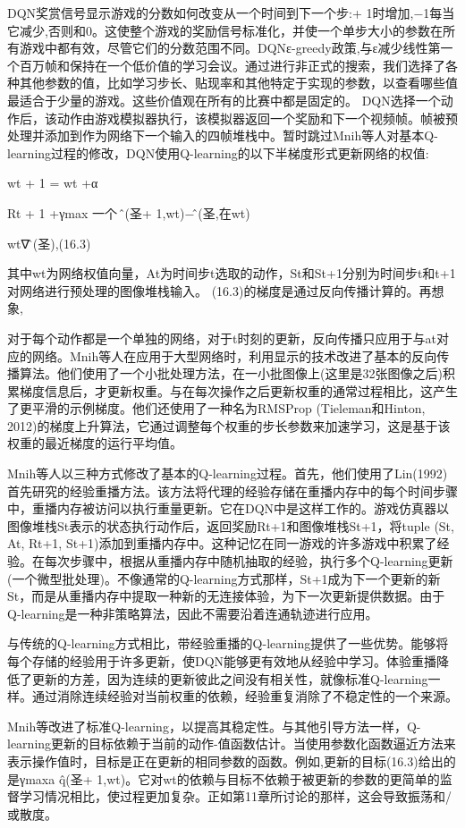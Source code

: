 DQN奖赏信号显示游戏的分数如何改变从一个时间到下一个步:+ 1时增加,−1每当它减少,否则和0。这使整个游戏的奖励信号标准化，并使一个单步大小的参数在所有游戏中都有效，尽管它们的分数范围不同。DQNε-greedy政策,与ε减少线性第一个百万帧和保持在一个低价值的学习会议。通过进行非正式的搜索，我们选择了各种其他参数的值，比如学习步长、贴现率和其他特定于实现的参数，以查看哪些值最适合于少量的游戏。这些价值观在所有的比赛中都是固定的。
DQN选择一个动作后，该动作由游戏模拟器执行，该模拟器返回一个奖励和下一个视频帧。帧被预处理并添加到作为网络下一个输入的四帧堆栈中。暂时跳过Mnih等人对基本Q-learning过程的修改，DQN使用Q-learning的以下半梯度形式更新网络的权值:

wt + 1 = wt +α

Rt + 1 +γmax
一个
问̂(圣+ 1,wt)−问̂(圣,在wt)

wt∇问̂(圣),(16.3)

其中wt为网络权值向量，At为时间步t选取的动作，St和St+1分别为时间步t和t+1对网络进行预处理的图像堆栈输入。
(16.3)的梯度是通过反向传播计算的。再想象,

对于每个动作都是一个单独的网络，对于t时刻的更新，反向传播只应用于与at对应的网络。Mnih等人在应用于大型网络时，利用显示的技术改进了基本的反向传播算法。他们使用了一个小批处理方法，在一小批图像上(这里是32张图像之后)积累梯度信息后，才更新权重。与在每次操作之后更新权重的通常过程相比，这产生了更平滑的示例梯度。他们还使用了一种名为RMSProp (Tieleman和Hinton, 2012)的梯度上升算法，它通过调整每个权重的步长参数来加速学习，这是基于该权重的最近梯度的运行平均值。

Mnih等人以三种方式修改了基本的Q-learning过程。首先，他们使用了Lin(1992)首先研究的经验重播方法。该方法将代理的经验存储在重播内存中的每个时间步骤中，重播内存被访问以执行重量更新。它在DQN中是这样工作的。游戏仿真器以图像堆栈St表示的状态执行动作后，返回奖励Rt+1和图像堆栈St+1，将tuple (St, At, Rt+1, St+1)添加到重播内存中。这种记忆在同一游戏的许多游戏中积累了经验。在每次步骤中，根据从重播内存中随机抽取的经验，执行多个Q-learning更新(一个微型批处理)。不像通常的Q-learning方式那样，St+1成为下一个更新的新St，而是从重播内存中提取一种新的无连接体验，为下一次更新提供数据。由于Q-learning是一种非策略算法，因此不需要沿着连通轨迹进行应用。

与传统的Q-learning方式相比，带经验重播的Q-learning提供了一些优势。能够将每个存储的经验用于许多更新，使DQN能够更有效地从经验中学习。体验重播降低了更新的方差，因为连续的更新彼此之间没有相关性，就像标准Q-learning一样。通过消除连续经验对当前权重的依赖，经验重复消除了不稳定性的一个来源。

Mnih等改进了标准Q-learning，以提高其稳定性。与其他引导方法一样，Q-learning更新的目标依赖于当前的动作-值函数估计。当使用参数化函数逼近方法来表示操作值时，目标是正在更新的相同参数的函数。例如,更新的目标(16.3)给出的是γmaxa q̂(圣+ 1,wt)。它对wt的依赖与目标不依赖于被更新的参数的更简单的监督学习情况相比，使过程更加复杂。正如第11章所讨论的那样，这会导致振荡和/或散度。

